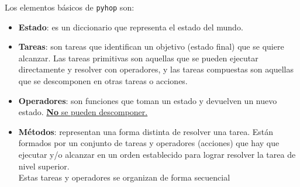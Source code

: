 Los elementos básicos de \texttt{pyhop} son:
\begin{itemize}
   \item \textbf{Estado}: es un diccionario que representa el estado del mundo.
   \item \textbf{Tareas}: son tareas que identifican un objetivo (estado final) que se quiere alcanzar. 
   Las tareas primitivas son aquellas que se pueden ejecutar directamente y resolver con operadores, y las tareas compuestas son aquellas que se descomponen en otras tareas o acciones.
   \item \textbf{Operadores}: son funciones que toman un estado y devuelven un nuevo estado. \ul{\textbf{No} se pueden descomponer.}
   \item \textbf{Métodos}: representan una forma distinta de resolver una tarea. Están formados por un conjunto de tareas y operadores (acciones) que hay que ejecutar y/o alcanzar en un orden establecido para lograr resolver la tarea de nivel superior.\\
   Estas tareas y operadores se organizan de forma secuencial
\end{itemize}